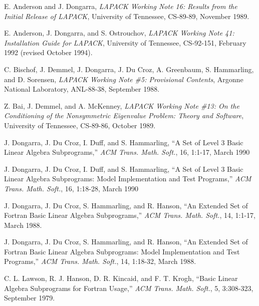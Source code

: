 E. Anderson and J. Dongarra,
{\em LAPACK Working Note 16: 
Results from the Initial Release of LAPACK},
University of Tennessee, CS-89-89, November 1989.

E. Anderson, J. Dongarra, and S. Ostrouchov,
{\em LAPACK Working Note 41: 
Installation Guide for LAPACK},
University of Tennessee, CS-92-151, February 1992 (revised October 1994).

C. Bischof, J. Demmel, J. Dongarra, J. Du Croz, A. Greenbaum,
S. Hammarling, and D. Sorensen,
{\em LAPACK Working Note \#5:  Provisional Contents},
Argonne National Laboratory, ANL-88-38, September 1988.

Z. Bai, J. Demmel, and A. McKenney,
{\em LAPACK Working Note \#13: On the Conditioning of the Nonsymmetric
Eigenvalue Problem:  Theory and Software}, 
University of Tennessee, CS-89-86, October 1989.
 
J. Dongarra, J. Du Croz, I. Duff, and S. Hammarling,
``A Set of Level 3 Basic Linear Algebra Subprograms,''
{\em ACM Trans. Math. Soft.}, 16, 1:1-17, March 1990

J. Dongarra, J. Du Croz, I. Duff, and S. Hammarling,
``A Set of Level 3 Basic Linear Algebra Subprograms:
Model Implementation and Test Programs,''
{\em ACM Trans. Math. Soft.}, 16, 1:18-28, March 1990

J. Dongarra, J. Du Croz, S. Hammarling, and R. Hanson,
``An Extended Set of Fortran Basic Linear Algebra Subprograms,''
{\em ACM Trans. Math. Soft.}, 14, 1:1-17, March 1988.

J. Dongarra, J. Du Croz, S. Hammarling, and R. Hanson,
``An Extended Set of Fortran Basic Linear Algebra Subprograms:
Model Implementation and Test Programs,''
{\em ACM Trans. Math. Soft.}, 14, 1:18-32, March 1988.

C. L. Lawson, R. J. Hanson, D. R. Kincaid, and F. T. Krogh,
``Basic Linear Algebra Subprograms for Fortran Usage,''
{\em ACM Trans. Math. Soft.}, 5, 3:308-323, September 1979.

\bibend


